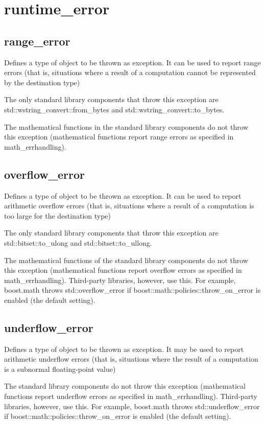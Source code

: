 \documentclass[UTF8,a4paper,12pt]{ctexbook}
\begin{document}
	\section{runtime\_error}
		\subsection{range\_error}
			Defines a type of object to be thrown as exception. It can be used to report range errors (that is, situations where a result of a computation cannot be represented by the destination type)
			
			The only standard library components that throw this exception are std::wstring\_convert::from\_bytes and std::wstring\_convert::to\_bytes.
			
			The mathematical functions in the standard library components do not throw this exception (mathematical functions report range errors as specified in math\_errhandling). 
		\subsection{overflow\_error}
			Defines a type of object to be thrown as exception. It can be used to report arithmetic overflow errors (that is, situations where a result of a computation is too large for the destination type)
			
			The only standard library components that throw this exception are std::bitset::to\_ulong and std::bitset::to\_ullong.
			
			The mathematical functions of the standard library components do not throw this exception (mathematical functions report overflow errors as specified in math\_errhandling). Third-party libraries, however, use this. For example, boost.math throws std::overflow\_error if boost::math::policies::throw\_on\_error is enabled (the default setting). 
		\subsection{underflow\_error}
			Defines a type of object to be thrown as exception. It may be used to report arithmetic underflow errors (that is, situations where the result of a computation is a subnormal floating-point value)
			
			The standard library components do not throw this exception (mathematical functions report underflow errors as specified in math\_errhandling). Third-party libraries, however, use this. For example, boost.math throws std::underflow\_error if boost::math::policies::throw\_on\_error is enabled (the default setting). 
\end{document}
